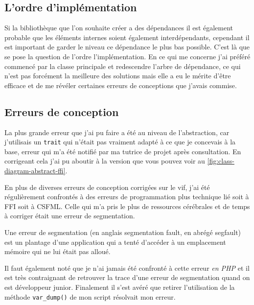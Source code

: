 \documentclass[11pt,a4paper,krantz2,11pt,oneside]{krantz}
\renewenvironment{quote}{\begin{VF}}{\end{VF}}
\begin{document}
\hypertarget{lordre-dimpluxe9mentation}{%
\subsection{L'ordre d'implémentation}\label{lordre-dimpluxe9mentation}}

Si la bibliothèque que l'on souhaite créer a des dépendances il est également probable que les éléments internes soient également interdépendants, cependant il est important de garder le niveau ce dépendance le plus bas possible. C'est là que se pose la question de l'ordre l'implémentation. En ce qui me concerne j'ai préféré commencé par la classe principale et redescendre l'arbre de dépendance, ce qui n'est pas forcément la meilleure des solutions mais elle a eu le mérite d'être efficace et de me révéler certaines erreurs de conceptions que j'avais commise.

\hypertarget{erreurs-de-conception}{%
\subsection{Erreurs de conception}\label{erreurs-de-conception}}

La plus grande erreur que j'ai pu faire a été au niveau de l'abstraction, car j'utilisais un \texttt{trait} qui n'était pas vraiment adapté à ce que je concevais à la base, erreur qui m'a été notifié par ma tutrice de projet après consultation. En corrigeant cela j'ai pu aboutir à la version que vous pouvez voir au \ref{fig:class-diagram-abstract-ffi}.

En plus de diverses erreurs de conception corrigées sur le vif, j'ai été régulièrement confrontés à des erreurs de programmation plus technique lié soit à FFI soit à CSFML. Celle qui m'a pris le plus de ressources cérébrales et de temps à corriger était une erreur de segmentation.

\begin{quote}
Une erreur de segmentation (en anglais segmentation fault, en abrégé segfault) est un plantage d'une application qui a tenté d'accéder à un emplacement mémoire qui ne lui était pas alloué.

\end{quote}

Il faut également noté que je n'ai jamais été confronté à cette erreur \emph{en PHP} et il est très contraignant de retrouver la trace d'une erreur de segmentation quand on est développeur junior. Finalement il s'est avéré que retirer l'utilisation de la méthode \texttt{var\_dump()} de mon script résolvait mon erreur.
\end{document}
